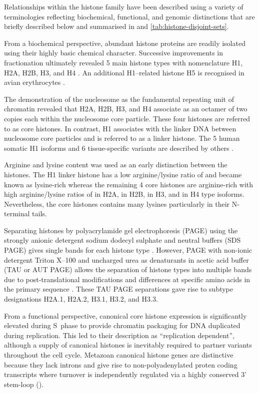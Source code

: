   Relationships within the histone family have been described using a variety of terminologies
  reflecting biochemical, functional, and genomic distinctions that are briefly described below
  and summarised in  and \ref{tab:histone-disjoint-sets}.

  From a biochemical perspective, abundant histone proteins
  are readily isolated using their highly basic chemical character.
  Successive improvements in fractionation ultimately revealed 5 main histone types
  with nomenclature H1, H2A, H2B, H3, and H4 \citep{nomenclature}.
  An additional H1--related histone H5 is recognised in avian erythrocytes \citep{HFive-review}.

  The demonstration of the nucleosome as the fundamental repeating unit of chromatin \citep{Kornberg1974}
  revealed that H2A, H2B, H3, and H4 associate as an octamer of two copies each within the
  nucleosome core particle. These four histones are referred to as core histones.
  In contrast, H1 associates with the linker DNA between nucleosome core particles
  and is referred to as a linker histone.
  The 5 human somatic H1 isoforms and 6 tissue-specific variants are described by others \citep{HarshmanFreitas2013}.

  Arginine and lysine content was used as an early distinction between the histones.
  The H1 linker histone has a low arginine/lysine ratio of \LinkerArgLysRatio{} and became known as lysine-rich
  whereas the remaining 4 core histones are arginine-rich
  with high arginine/lysine ratios of \HTwoAArgLysRatio{} in H2A, \HTwoBArgLysRatio{} in H2B,
  \HThreeArgLysRatio{} in H3, and \HFourArgLysRatio{} in H4 type isoforms.
  Nevertheless, the core histones contains many lysines particularly in their N-terminal tails.

  Separating histones by polyacrylamide gel electrophoresis (PAGE)
  using the strongly anionic detergent sodium dodecyl sulphate and neutral buffers (SDS PAGE)
  gives single bands for each histone type \citep{ShechterHake2007}.
  However, PAGE with non-ionic detergent Triton X--100 and uncharged urea as denaturants
  in acetic acid buffer (TAU or AUT PAGE) allows the separation of histone types into multiple bands
  due to post-translational modifications and differences at specific amino acids
  in the primary sequence \citep{Zweidler1977}.
  These TAU PAGE separations gave rise to subtype designations H2A.1, H2A.2, H3.1, H3.2, and H3.3.

  From a functional perspective, canonical core histone expression
  is significantly elevated during S~phase to provide chromatin packaging
  for DNA duplicated during replication.
  This led to their description as ``replication dependent'',
  although a supply of canonical histones is inevitably required
  to partner variants throughout the cell cycle.
  Metazoan canonical histone genes are distinctive
  because they lack introns and give rise to non-polyadenylated proten coding transcripts
  where turnover is independently regulated via a highly conserved 3' stem-loop ().

